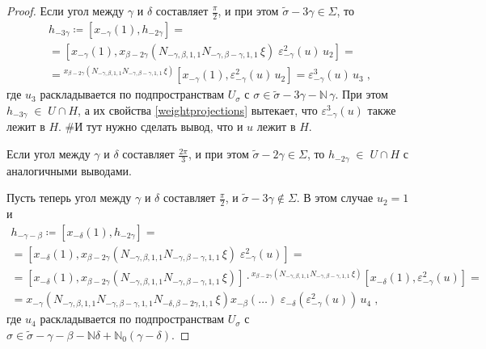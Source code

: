\documentclass[10pt]{article}
\theoremstyle{remark}
\newcommand{\N}{\mathbb{N}}
\begin{document}
\begin{proof}
Если угол между $\gamma$ и $\delta$ составляет $\frac{\pi}{2}$, и при этом $\widetilde\sigma-3\gamma\in\Sigma$, то
\begin{multline*}
h_{-3\gamma} \coloneqq [x_{-\gamma}(1),h_{-2\gamma}] = \\ =
[x_{-\gamma}(1), x_{\beta-2\gamma}(N_{-\gamma,\beta,1,1} N_{-\gamma,\beta-\gamma,1,1} \, \xi) \; \varepsilon^2_{-\gamma}(u) \, u_2] = \\ =
{}^{x_{\beta-2\gamma}(N_{-\gamma,\beta,1,1} N_{-\gamma,\beta-\gamma,1,1} \, \xi)}[x_{-\gamma}(1),\varepsilon^2_{-\gamma}(u) \, u_2] =
\varepsilon^3_{-\gamma}(u) \, u_3
 \; ,
\end{multline*}
где $u_3$ раскладывается по подпространствам $U_\sigma$ с $\sigma \in \widetilde\sigma-3\gamma - \N \, \gamma$.
При этом $h_{-3\gamma}\;\in\;U\cap H$, а их свойства \ref{weightprojections} вытекает, что $\varepsilon^3_{-\gamma}(u)$ также лежит в $H$. \#И тут нужно сделать вывод, что и $u$ лежит в $H$.

Если угол между $\gamma$ и $\delta$ составляет $\frac{2\pi}{3}$, и при этом $\widetilde\sigma-2\gamma\in\Sigma$, то $h_{-2\gamma}\;\in\;U\cap H$ с аналогичными выводами.

Пусть теперь угол между $\gamma$ и $\delta$ составляет $\frac{\pi}{2}$, и $\widetilde\sigma-3\gamma\notin\Sigma$. В этом случае $u_2=1$ и
\begin{multline*}
h_{-\gamma-\beta} \coloneqq [x_{-\delta}(1),h_{-2\gamma}] = \\ =
[x_{-\delta}(1), x_{\beta-2\gamma}(N_{-\gamma,\beta,1,1} N_{-\gamma,\beta-\gamma,1,1} \, \xi) \; \varepsilon^2_{-\gamma}(u)] = \\ =
[x_{-\delta}(1), x_{\beta-2\gamma}(N_{-\gamma,\beta,1,1} N_{-\gamma,\beta-\gamma,1,1} \, \xi)] \cdot {}^{x_{\beta-2\gamma}(N_{-\gamma,\beta,1,1} N_{-\gamma,\beta-\gamma,1,1} \, \xi)}[x_{-\delta}(1),\varepsilon^2_{-\gamma}(u)] = \\ =
x_{-\gamma}(N_{-\gamma,\beta,1,1} N_{-\gamma,\beta-\gamma,1,1} N_{-\delta,\beta-2\gamma,1,1} \, \xi) x_{-\beta}(\ldots) \; \varepsilon_{-\delta}(\varepsilon_{-\gamma}^2(u))\,u_4
 \; ,
\end{multline*}
где $u_4$ раскладывается по подпространствам $U_\sigma$ с $\sigma \in \widetilde\sigma-\gamma-\beta- \N\delta + \N_0 (\gamma-\delta)$.


\end{proof}
\end{document}
